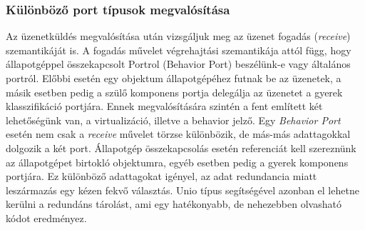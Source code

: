 \documentclass[a4paper,12pt]{report}
\begin{document}
\subsubsection{Különböző port típusok megvalósítása}
Az üzenetküldés megvalósítása után vizsgáljuk meg az üzenet fogadás (\textit{receive}) szemantikáját is. A fogadás művelet végrehajtási szemantikája attól függ, hogy állapotgéppel összekapcsolt Portrol (Behavior Port) beszélünk-e vagy általános portról. Előbbi esetén egy objektum állapotgépéhez futnak be az üzenetek, a másik esetben pedig a szülő komponens portja delegálja az üzenetet a gyerek klasszifikáció portjára. Ennek megvalósítására szintén a fent említett két lehetőségünk van, a virtualizáció, illetve a behavior jelző. Egy \textit{Behavior Port} esetén nem csak a \textit{receive} művelet törzse különbözik, de más-más adattagokkal dolgozik a két port. Állapotgép összekapcsolás esetén referenciát kell szereznünk az állapotgépet birtokló objektumra, egyéb esetben pedig a gyerek komponens portjára. Ez különböző adattagokat igényel, az adat redundancia miatt leszármazás egy kézen fekvő választás. Unio típus segítségével azonban el lehetne kerülni a redundáns tárolást, ami egy hatékonyabb, de nehezebben olvasható kódot eredményez.
\end{document}
